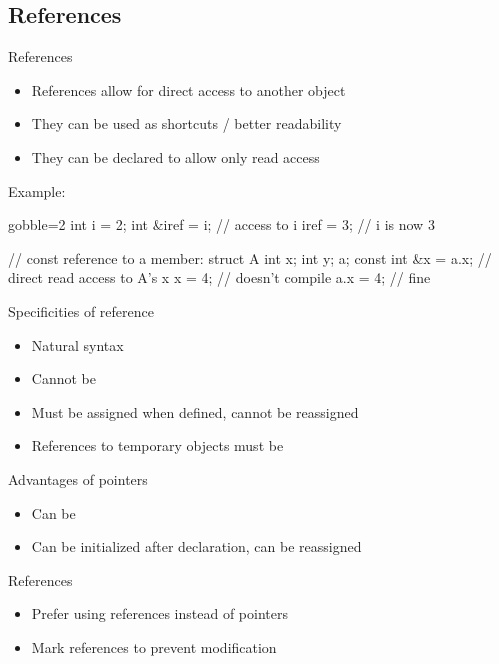 \subsection[Refs]{References}

\begin{frame}[fragile]
  \begin{block}{References}
    \begin{itemize}
      \item References allow for direct access to another object
      \item They can be used as shortcuts / better readability
      \item They can be declared  to allow only read access
    \end{itemize}
  \end{block}

  \begin{exampleblock}{Example:}
    \begin{cppcode*}{gobble=2}
      int i = 2;
      int &iref = i; // access to i
      iref = 3;      // i is now 3

      // const reference to a member:
      struct A { int x; int y; } a;
      const int &x = a.x; // direct read access to A's x
      x = 4;              // doesn't compile
      a.x = 4;            // fine
    \end{cppcode*}
  \end{exampleblock}
\end{frame}

\begin{frame}[fragile]
  \begin{block}{Specificities of reference}
    \begin{itemize}
    \item Natural syntax
    \item Cannot be 
    \item Must be assigned when defined, cannot be reassigned
    \item References to temporary objects must be 
    \end{itemize}
  \end{block}
  \begin{block}{Advantages of pointers}
    \begin{itemize}
    \item Can be 
    \item Can be initialized after declaration, can be reassigned
    \end{itemize}
  \end{block}
  \pause
  \begin{goodpractice}{References}
    \begin{itemize}
      \item Prefer using references instead of pointers
      \item Mark references  to prevent modification
    \end{itemize}
  \end{goodpractice}
\end{frame}
